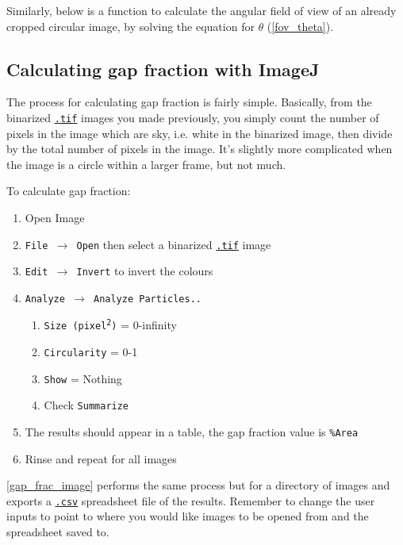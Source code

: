 \documentclass{article}
\newcommand\menu[1]{\texttt{\color{blue}#1}}
\newcommand\file[1]{\texttt{\underline{#1}}}
\begin{document}
Similarly, below is a function to calculate the angular field of view of an already cropped circular image, by solving the equation for $\theta$ (\autoref{fov_theta}). 

\begin{minipage}{\linewidth}

\end{minipage}

\subsection{Calculating gap fraction with ImageJ}

The process for calculating gap fraction is fairly simple. Basically, from the binarized \file{.tif} images you made previously, you simply count the number of pixels in the image which are sky, i.e. white in the binarized image, then divide by the total number of pixels in the image. It's slightly more complicated when the image is a circle within a larger frame, but not much.

To calculate gap fraction: 

\begin{enumerate}
	\item{Open Image}
	\item{\menu{File $\rightarrow$ Open} then select a binarized \file{.tif} image} 
	\item{\menu{Edit $\rightarrow$ Invert} to invert the colours}
	\item{\menu{Analyze $\rightarrow$ Analyze Particles..}}
		\begin{enumerate}
			\item{\menu{Size (pixel\textsuperscript{2})} = 0-infinity}
			\item{\menu{Circularity} = 0-1}
			\item{\menu{Show} = Nothing}
			\item{Check \menu{Summarize}}
		\end{enumerate}
	\item{The results should appear in a table, the gap fraction value is \menu{\%Area}}
	\item{Rinse and repeat for all images}
\end{enumerate}

\autoref{gap_frac_image} performs the same process but for a directory of images and exports a \file{.csv} spreadsheet file of the results. Remember to change the user inputs to point to where you would like images to be opened from and the spreadsheet saved to.
\end{document}
